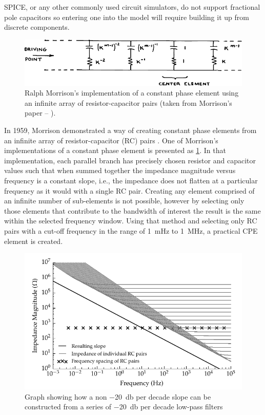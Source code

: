     SPICE, or any other commonly used circuit simulators, do not support fractional pole capacitors so entering one into the model will require building it up from discrete components.
    \begin{figure}[h]
      \centering
      \includegraphics{content/pt2/07-InterfaceModel/graphics/Morrison-RC}
      \caption{\label{graph:pt2-morrisonCPE}Ralph Morrison's implementation of a constant phase element using an infinite array of resistor-capacitor pairs (taken from Morrison's paper -- \cite{Morrison1959}).}
    \end{figure}
    In 1959, Morrison demonstrated a way of creating constant phase elements from an infinite array of resistor-capacitor (RC) pairs \cite{Morrison1959}.
    One of Morrison's implementations of a constant phase element is presented as \cref{graph:pt2-morrisonCPE}.
    In that implementation, each parallel branch has precisely chosen resistor and capacitor values such that when summed together the impedance magnitude versus frequency is a constant slope, i.e., the impedance does not flatten at a particular frequency as it would with a single RC pair.
    Creating any element comprised of an infinite number of sub-elements is not possible, however by selecting only those elements that contribute to the bandwidth of interest the result is the same within the selected frequency window.
    Using that method and selecting only RC pairs with a cut-off frequency in the range of \SI{1}{\milli\hertz} to \SI{1}{\mega\hertz}, a practical CPE element is created.

    \begin{figure}
      \centering
      \includegraphics{content/pt2/07-InterfaceModel/graphics/graph_cpe_creation}
      \caption{\label{graph:pt2-cpe_creation}Graph showing how a non \SI{-20}{\decibel} per decade slope can be constructed from a series of \SI{-20}{\decibel} per decade low-pass filters}
    \end{figure}

